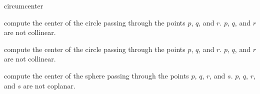 \begin{ccRefFunction}{circumcenter}

 {compute the center of the circle passing through the points $p$, $q$, and $r$.
  \ccPrecond $p$, $q$, and $r$ are not collinear.}

 {compute the center of the circle passing through the points $p$, $q$, and $r$.
  \ccPrecond $p$, $q$, and $r$ are not collinear.}

 {compute the center of the sphere passing through the points $p$, $q$, $r$, and $s$.
  \ccPrecond $p$, $q$, $r$, and $s$ are not coplanar.}
\end{ccRefFunction}

